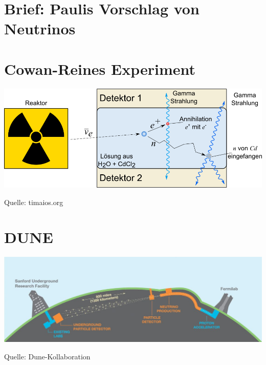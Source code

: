 \documentclass{artifacts/bll}
\begin{document}
    \section{Brief: Paulis Vorschlag von Neutrinos}
    \label{lab:pauli-brief}    
    

    \section{Cowan-Reines Experiment}
    \label{fig:c-experiment}
    \begin{center}
        \includegraphics[width=1\textwidth]{appendix/cowanreines}
    \end{center}   
    Quelle: timaios.org

    \section{DUNE}
    \label{fig:dune}
    \begin{center}
        \includegraphics[width=1\textwidth]{appendix/dune}
    \end{center}
    Quelle: Dune-Kollaboration
    
    
\end{document}
